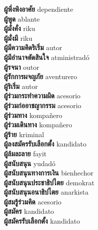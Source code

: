 \textbf{ ผู้พึ่งพิงอาศัย  } dependiente \\
\textbf{ ผู้พูด  } ablante \\
\textbf{ ผู้มั่งคั่ง  } riku \\
\textbf{ ผู้มั่งมี  } riku \\
\textbf{ ผู้มีความคิดริเริ่ม  } autor \\
\textbf{ ผู้มีอำนาจตัดสินใจ  } atministradó \\
\textbf{ ผู้รจนา  } outor \\
\textbf{ ผู้รักการผจญภัย  } aventurero \\
\textbf{ ผู้ริเริ่ม  } autor \\
\textbf{ ผู้ร่วมกระทำความผิด  } acesorio \\
\textbf{ ผู้ร่วมก่ออาชญากรรม  } acesorio \\
\textbf{ ผู้ร่วมทาง  } kompañero \\
\textbf{ ผู้ร่วมเดินทาง  } kompañero \\
\textbf{ ผู้ร้าย  } kriminal \\
\textbf{ ผู้ลงสมัครรับเลือกตั้ง  } kandidato \\
\textbf{ ผู้ล้มละลาย  } fayit \\
\textbf{ ผู้สนับสนุน  } yudadó \\
\textbf{ ผู้สนับสนุนทางการเงิน  } bienhechor \\
\textbf{ ผู้สนับสนุนประชาธิปไตย  } demokrat \\
\textbf{ ผู้สนับสนุนอนาธิปไตย  } anarkista \\
\textbf{ ผู้สมรู้ร่วมคิด  } acesorio \\
\textbf{ ผู้สมัคร  } kandidato \\
\textbf{ ผู้สมัครรับเลือกตั้ง  } kandidato \\
